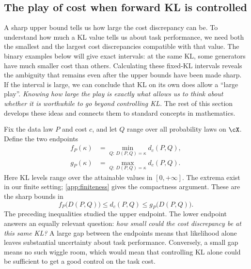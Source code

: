 \documentclass[11pt,twoside]{article}
\newcommand{\KL}{D}
\theoremstyle{definition}
\theoremstyle{remark}
\begin{document}
\subsection{The play of cost when forward KL is controlled}
\label{sec:discrepancy-comparison}

A sharp upper bound tells us how large the cost discrepancy can be.
To understand how much a KL value tells us about task performance, we
need both the smallest and the largest cost discrepancies compatible
with that value. The binary examples below will give exact intervals:
at the same KL, some generators have much smaller cost than others.
Calculating these fixed-KL intervals reveals the ambiguity that remains
even after the upper bounds have been made sharp.
If the interval is large, we can conclude that KL on its own
does allow a ``large play''.
\emph{Knowing how large the play is exactly what allows us to think
about whether it is worthwhile to go beyond controlling KL.}
The rest of this section develops these ideas and connects them
to standard concepts in mathematics.

Fix the data law \(P\) and cost \(c\), and let \(Q\) range over all
probability laws on \(\cX\). Define the two endpoints
\begin{equation}
 \begin{split}
 f_P(\kappa)&=\min_{Q:\,\KL(P, Q)=\kappa}d_c(P,Q),\\
 g_P(\kappa)&=\max_{Q:\,\KL(P, Q)=\kappa}d_c(P,Q).
 \end{split}
 \label{eq:fixed-kl-endpoints}
\end{equation}
Here KL levels range over the attainable values in \([0,+\infty]\).
The extrema exist in our finite setting; \cref{app:finiteness}
gives the compactness argument. These are the sharp bounds in
\[
 f_P\bigl(\KL(P, Q)\bigr)
 \le d_c(P,Q)\le
 g_P\bigl(\KL(P, Q)\bigr).
\]
The preceding inequalities studied the upper endpoint. The lower
endpoint answers an equally relevant question: \emph{how small could
the cost discrepancy be at this same KL?} A large gap between the
endpoints means that likelihood alone leaves substantial uncertainty
about task performance.
Conversely, a small gap means no such wiggle room,
which would mean that controlling KL alone could be sufficient
to get a good control on the task cost.
\end{document}
